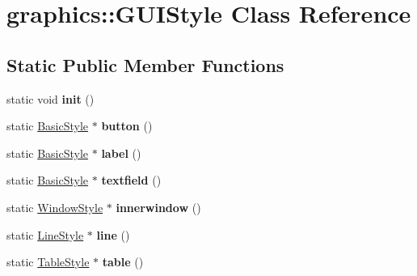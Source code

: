 \hypertarget{classgraphics_1_1_g_u_i_style}{\section{graphics\-:\-:G\-U\-I\-Style Class Reference}
\label{classgraphics_1_1_g_u_i_style}
}
\subsection*{Static Public Member Functions}
\begin{DoxyCompactItemize}
\item 
\hypertarget{classgraphics_1_1_g_u_i_style_a6785f4696b1e1268812344674b66dd22}{static void {\bfseries init} ()}\label{classgraphics_1_1_g_u_i_style_a6785f4696b1e1268812344674b66dd22}

\item 
\hypertarget{classgraphics_1_1_g_u_i_style_a11afb2757827312ae14752da30237248}{static \hyperlink{classgraphics_1_1_basic_style}{Basic\-Style} $\ast$ {\bfseries button} ()}\label{classgraphics_1_1_g_u_i_style_a11afb2757827312ae14752da30237248}

\item 
\hypertarget{classgraphics_1_1_g_u_i_style_a849c2c9729f3099dc40e2bdf8a238285}{static \hyperlink{classgraphics_1_1_basic_style}{Basic\-Style} $\ast$ {\bfseries label} ()}\label{classgraphics_1_1_g_u_i_style_a849c2c9729f3099dc40e2bdf8a238285}

\item 
\hypertarget{classgraphics_1_1_g_u_i_style_a630afba4933f48deede4bba5cf2dd13e}{static \hyperlink{classgraphics_1_1_basic_style}{Basic\-Style} $\ast$ {\bfseries textfield} ()}\label{classgraphics_1_1_g_u_i_style_a630afba4933f48deede4bba5cf2dd13e}

\item 
\hypertarget{classgraphics_1_1_g_u_i_style_aae564f289a86292f336a662b78dd2251}{static \hyperlink{classgraphics_1_1_window_style}{Window\-Style} $\ast$ {\bfseries innerwindow} ()}\label{classgraphics_1_1_g_u_i_style_aae564f289a86292f336a662b78dd2251}

\item 
\hypertarget{classgraphics_1_1_g_u_i_style_a7309d2fcea1e054bb9205bb6e2bf63e3}{static \hyperlink{classgraphics_1_1_line_style}{Line\-Style} $\ast$ {\bfseries line} ()}\label{classgraphics_1_1_g_u_i_style_a7309d2fcea1e054bb9205bb6e2bf63e3}

\item 
\hypertarget{classgraphics_1_1_g_u_i_style_a3c02e79ae99b8c40f43ef00d35f4a3b4}{static \hyperlink{classgraphics_1_1_table_style}{Table\-Style} $\ast$ {\bfseries table} ()}\label{classgraphics_1_1_g_u_i_style_a3c02e79ae99b8c40f43ef00d35f4a3b4}


\end{DoxyCompactItemize}
